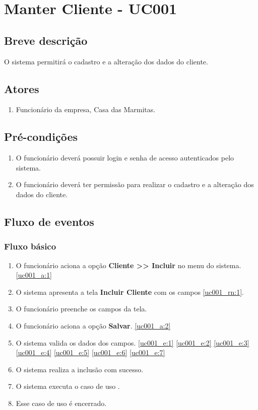 \chapter{Manter Cliente - UC001} \label{uc001}
 
\section{Breve descrição}
 
O sistema permitirá o cadastro e a alteração dos dados do cliente.

\section{Atores}

\begin{enumerate}
	\item Funcionário da empresa, Casa das Marmitas.
\end{enumerate}

\section{Pré-condições}

\begin{enumerate}
	\item O funcionário deverá possuir login e senha de acesso autenticados pelo sistema.
	\item O funcionário deverá ter permissão para realizar o cadastro e a alteração dos dados do cliente.
\end{enumerate}

\section{Fluxo de eventos}

\subsection{Fluxo básico}

\begin{enumerate}[label=P\arabic*]
	\item O funcionário aciona a opção \textbf{Cliente >> Incluir} no menu do sistema. \label{uc001_p:1}\ref{uc001_a:1}
	\item O sistema apresenta a tela \textbf{Incluir Cliente} com os campos \ref{uc001_rn:1}. \label{uc001_p:2}
	\item O funcionário preenche os campos da tela. \label{uc001_p:3}
	\item O funcionário aciona a opção \textbf{Salvar}. \label{uc001_p:4}\ref{uc001_a:2}
	\item O sistema valida os dados dos campos. \ref{uc001_e:1} \ref{uc001_e:2} \ref{uc001_e:3} \ref{uc001_e:4} \ref{uc001_e:5} \ref{uc001_e:6} \ref{uc001_e:7}
	\item O sistema realiza a inclusão com sucesso.
	\item O sistema executa o caso de uso .
	\item Esse caso de uso é encerrado.	
\end{enumerate}

